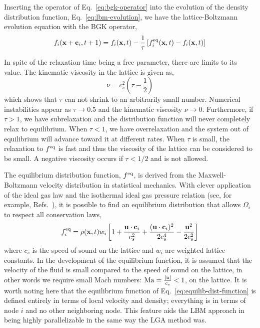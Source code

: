 Inserting the operator of Eq.~\ref{eq:bgk-operator} into the evolution of the density distribution function, Eq.~\ref{eq:lbm-evolution}, we have the lattice-Boltzmann evolution equation with the BGK operator,
\begin{equation}\label{eq:lbm-bgk}
	f_i(\mathbf{x}+\mathbf{c}_i, t + 1) = f_i(\mathbf{x},t) - \frac{1}{\tau}\left[f_i^{\text{eq}}(\mathbf{x},t) - f_i(\mathbf{x},t)\right]
\end{equation}

In spite of the relaxation time being a free parameter, there are limits to its value. The kinematic viscosity in the lattice is given as,
\begin{equation}\label{eq:lbm-viscosity-relaxation-time}
	\nu = c_s^2\left(\tau-\frac{1}{2}\right)
\end{equation}
which shows that $\tau$ can not shrink to an arbitrarily small number. Numerical instabilities appear as $\tau \rightarrow 0.5$ and the kinematic viscosity $\nu \rightarrow 0$. Furthermore, if $\tau > 1$, we have subrelaxation and the distribution function will never completely relax to equilibrium. When $\tau < 1$, we have overrelaxation and the system out of equilibrium will advance toward it at different rates. When $\tau$ is small, the relaxation to $f^{\text{eq}}$ is fast and thus the viscosity of the lattice can be considered to be small. A negative viscosity occurs if $\tau < 1/2$ and is not allowed.\cite{Chopard2002,Chen1998a}

The equilibrium distribution function, $f^{\text{eq}}$, is derived from the Maxwell-Boltzmann velocity distribution in statistical mechanics. With clever application of the ideal gas law and the isothermal ideal gas pressure relation (see, for example, Refs.~\cite{Viggen2009,Chopard2002}), it is possible to find an equilibrium distribution that allows $\Omega_i$ to respect all conservation laws,
\begin{equation}\label{eq:equilib-dist-function}
	f_i^{\text{eq}} = \rho(\mathbf{x},t)w_i\left[1+\frac{\mathbf{u}\cdot\mathbf{c}_i}{c_s^2} + \frac{(\mathbf{u}\cdot\mathbf{c}_i)^2}{2c_s^4} - \frac{\mathbf{u}^2}{2c_s^2} \right]
\end{equation}
where $c_s$ is the speed of sound on the lattice and $w_i$ are weighted lattice constants. In the development of the equilibrium function, it is assumed that the velocity of the fluid is small compared to the speed of sound on the lattice, in other words we require small Mach numbers: $\mathrm{Ma} = \frac{|u|}{c_s} < 1$, on the lattice.\cite{qian1992lattice,Chen1998a} It is worth noting here that the equilibrium function of Eq.~\ref{eq:equilib-dist-function} is defined entirely in terms of local velocity and density; everything is in terms of node $i$ and no other neighboring node. This feature aids the LBM approach in being highly parallelizable in the same way the LGA method was.

